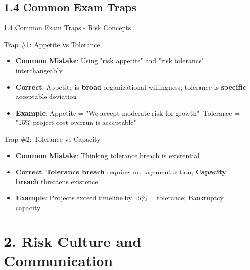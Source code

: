 \documentclass[10pt]{beamer}  %
\begin{document}
	\subsection{1.4 Common Exam Traps}
	\begin{frame}{1.4 Common Exam Traps - Risk Concepts}
		\begin{block}{Trap \#1: Appetite vs Tolerance}
			\begin{itemize}
				\item \textbf{Common Mistake}: Using "risk appetite" and "risk tolerance" interchangeably
				\item \textbf{Correct}: Appetite is \textbf{broad} organizational willingness; tolerance is \textbf{specific} acceptable deviation
				\item \textbf{Example}: Appetite = "We accept moderate risk for growth"; Tolerance = "15\% project cost overrun is acceptable"
			\end{itemize}
		\end{block}
		
		\begin{block}{Trap \#2: Tolerance vs Capacity}
			\begin{itemize}
				\item \textbf{Common Mistake}: Thinking tolerance breach is existential
				\item \textbf{Correct}: \textbf{Tolerance breach} requires management action; \textbf{Capacity breach} threatens existence
				\item \textbf{Example}: Projects exceed timeline by 15\% = tolerance; Bankruptcy = capacity
			\end{itemize}
		\end{block}
	\end{frame}
	
	\section{2. Risk Culture and Communication}
	
\end{document}
